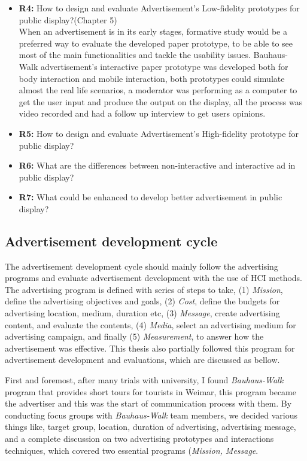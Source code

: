 \begin{itemize}
\item \textbf{R4: }How to design and evaluate Advertisement's Low-fidelity prototypes for public display?(Chapter 5) \\
When an advertisement is in its early stages, formative study would be a preferred way to evaluate the developed paper prototype, to be able to see most of the main functionalities and tackle the usability issues. Bauhaus-Walk advertisement’s interactive paper prototype was developed both for body interaction and mobile interaction, both prototypes could simulate almost the real life scenarios, a moderator was performing as a computer to get the user input and produce the output on the display, all the process was video recorded and had a follow up interview to get users opinions. 


\item \textbf{R5: }How to design and evaluate Advertisement's High-fidelity prototype for public display?
\item \textbf{R6: }What are the differences between non-interactive and interactive ad in public display?
\item \textbf{R7: }What could be enhanced to develop better advertisement in public display? 

\end{itemize}
\fi

\subsection{Advertisement development cycle}
The advertisement development cycle should mainly follow the advertising programs\cite{ad_def} and evaluate advertisement development with the use of HCI methods. The advertising program is defined with series of steps to take, (1) \emph{Mission}, define the advertising objectives and goals, (2) \emph{Cost}, define the budgets for advertising location, medium, duration etc, (3) \emph{Message}, create advertising content, and evaluate the contents, (4) \emph{Media}, select an advertising medium for advertising campaign, and finally (5) \emph{Measurement}, to answer how the advertisement was effective. This thesis also partially followed this program for advertisement development and evaluations, which are discussed as bellow.

First and foremost, after many trials with university, I found \emph{Bauhaus-Walk} program that provides short tours for tourists in Weimar, this program became the advertiser and this was the start of communication process with them. By conducting focus groups with \emph{Bauhaus-Walk} team members, we decided various things like, target group, location, duration of advertising, advertising message, and a complete discussion on two advertising prototypes and interactions techniques, which covered two essential programs (\emph{Mission, Message}.

